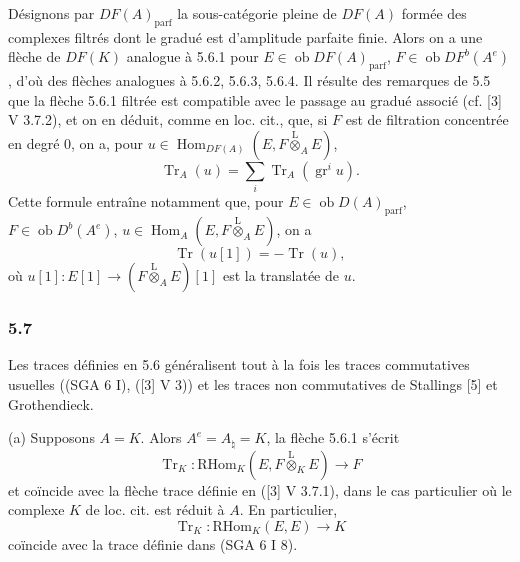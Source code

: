 \documentclass[11pt]{article}
\DeclareMathOperator{\Hom}{Hom}
\newcommand{\ob}{\operatorname{ob}}
\providecommand{\RHom}{\mathrm{RHom}}
\providecommand{\Tr}{\operatorname{Tr}}
\providecommand{\Tr}{\operatorname{Tr}}
\providecommand{\lten}{\overset{\mathrm L}{\otimes}}
\providecommand{\Tr}{\operatorname{Tr}}
\providecommand{\RHom}{\mathrm{RHom}}
\providecommand{\Hom}{\operatorname{Hom}}
\providecommand{\ob}{\operatorname{ob}}
\providecommand{\lten}{\overset{\mathrm L}{\otimes}}
\providecommand{\RHom}{\mathrm R\mathcal{H}om}
\providecommand{\lten}{\overset{\mathrm L}{\otimes}}
\providecommand{\Tr}{\operatorname{Tr}}
\providecommand{\lten}{\overset{\mathrm L}{\otimes}}
\providecommand{\lten}{\overset{\mathrm L}{\otimes}}
\providecommand{\lten}{\overset{\mathrm L}{\otimes}}
\begin{document}
Désignons par $DF(A)_{\mathrm{parf}}$ la sous-catégorie pleine de $DF(A)$ formée des complexes filtrés dont le gradué est d'amplitude parfaite finie. Alors on a une flèche de $DF(K)$ analogue à 5.6.1 pour $E\in\ob DF(A)_{\mathrm{parf}}$, $F\in\ob DF^b(A^e)$, d'où des flèches analogues à 5.6.2, 5.6.3, 5.6.4. Il résulte des remarques de 5.5 que la flèche 5.6.1 filtrée est compatible avec le passage au gradué associé (cf. [3] V 3.7.2), et on en déduit, comme en loc. cit., que, si $F$ est de filtration concentrée en degré $0$, on a, pour $u\in\Hom_{DF(A)}(E,F\lten_AE)$,
\begin{equation}\tag{5.6.5}
\Tr_A(u)=\sum_i\Tr_A(\operatorname{gr}^i u).
\end{equation}
Cette formule entraîne notamment que, pour $E\in\ob D(A)_{\mathrm{parf}}$, $F\in\ob D^b(A^e)$, $u\in\Hom_A(E,F\lten_AE)$, on a
\begin{equation}\tag{5.6.6}
\Tr(u[1])=-\Tr(u),
\end{equation}
où $u[1]:E[1]\to(F\lten_AE)[1]$ est la translatée de $u$.

\subsubsection*{5.7}

Les traces définies en 5.6 généralisent tout à la fois les traces commutatives usuelles ((SGA 6 I), ([3] V 3)) et les traces non commutatives de Stallings [5] et Grothendieck.

(a) Supposons $A=K$. Alors $A^e=A_\natural=K$, la flèche 5.6.1 s'écrit
\[
\Tr_K:\RHom_K(E,F\lten_KE)\longrightarrow F
\]
et coïncide avec la flèche trace définie en ([3] V 3.7.1), dans le cas particulier où le complexe $K$ de loc. cit. est réduit à $A$. En particulier,
\[
\Tr_K:\RHom_K(E,E)\longrightarrow K
\]
coïncide avec la trace définie dans (SGA 6 I 8).
\end{document}
